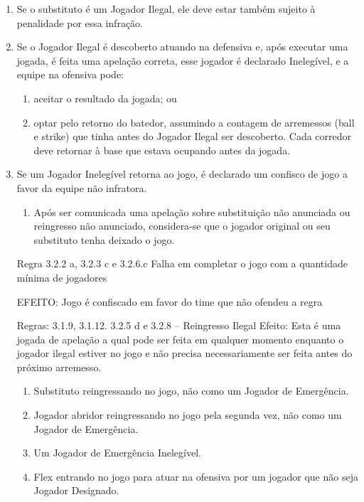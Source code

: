 \begin{enumerate}[label=(\alph*)]
	\item Se o substituto é um Jogador Ilegal, ele deve estar também sujeito à  penalidade por essa infração.
	\item Se o Jogador Ilegal é descoberto atuando na defensiva e, após executar uma jogada, é feita uma apelação correta, esse jogador é declarado Inelegível, e a equipe na ofensiva pode:

	\begin{enumerate}[label=\arabic*)]
		\item  aceitar o resultado da jogada; ou
		\item optar pelo retorno do batedor, assumindo a contagem de arremessos (\gls{ball} e \gls{strike})  que tinha antes do Jogador Ilegal ser descoberto. Cada corredor deve retornar à base que estava ocupando antes da jogada.
	\end{enumerate}
	\item Se um Jogador Inelegível retorna ao jogo, é declarado um confisco de jogo a favor da equipe não infratora.

	\begin{enumerate}[label=\roman*.]
		\item  Após ser comunicada uma apelação sobre substituição não anunciada ou reingresso não anunciado, considera-se que o jogador original ou seu substituto tenha deixado o jogo.
 	\end{enumerate}

 Regra 3.2.2 a, 3.2.3 c e 3.2.6.c
  Falha em completar o jogo com a quantidade mínima de jogadores

 EFEITO:
 Jogo é confiscado em favor do time que não ofendeu a regra

 Regras: 3.1.9, 3.1.12. 3.2.5 d e 3.2.8 -- Reingresso Ilegal
 Efeito:
 Esta é uma jogada de apelação a qual pode ser feita em qualquer momento enquanto o jogador ilegal estiver no jogo e não precisa necessariamente ser feita antes do próximo arremesso.

	 \begin{enumerate}[label=\roman*.]
	 	\item Substituto reingressando no jogo, não como um Jogador de Emergência.
		\item Jogador abridor reingressando no jogo pela segunda vez, não como um Jogador de Emergência.
		\item Um Jogador de Emergência Inelegível.
		\item Flex entrando no jogo para atuar na ofensiva por um jogador que não seja  Jogador Designado.
	\end{enumerate}



\end{enumerate}
